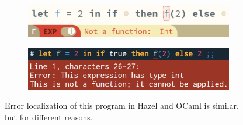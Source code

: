 
\begin{figure}[H]
\centering
\begin{subfigure}{.5\textwidth}
  \centering
  \includegraphics[width=0.9\linewidth]{images/localExCombined.png}
  \label{fig:hazelLocalEx}
\end{subfigure}%
\begin{subfigure}{.5\textwidth}
  \centering
  \includegraphics[width=0.9\linewidth]{images/ocamlEx.png}
  \label{fig:ocamlEx}
\end{subfigure}
\caption{Error localization of this program in Hazel and OCaml is similar, but for different reasons.}
\label{fig:localComparison}
\end{figure}




